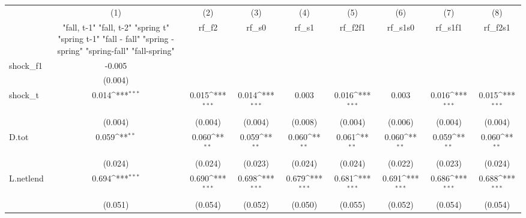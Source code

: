 {
\def\sym#1{\ifmmode^{#1}\else\(^{#1}\)\fi}
\begin{tabular}{l*{8}{c}}
\toprule
            &\multicolumn{1}{c}{(1)}&\multicolumn{1}{c}{(2)}&\multicolumn{1}{c}{(3)}&\multicolumn{1}{c}{(4)}&\multicolumn{1}{c}{(5)}&\multicolumn{1}{c}{(6)}&\multicolumn{1}{c}{(7)}&\multicolumn{1}{c}{(8)}\\
            &\multicolumn{1}{c}{  "fall, t-1" "fall, t-2" "spring t" "spring t-1"  "fall - fall" "spring - spring" "spring-fall" "fall-spring" }&\multicolumn{1}{c}{rf\_f2}&\multicolumn{1}{c}{rf\_s0}&\multicolumn{1}{c}{rf\_s1}&\multicolumn{1}{c}{rf\_f2f1}&\multicolumn{1}{c}{rf\_s1s0}&\multicolumn{1}{c}{rf\_s1f1}&\multicolumn{1}{c}{rf\_f2s1}\\
\midrule
shock\_f1    &      -0.005         &                     &                     &                     &                     &                     &                     &                     \\
            &     (0.004)         &                     &                     &                     &                     &                     &                     &                     \\
\addlinespace
shock\_t     &       0.014\sym{***}&       0.015\sym{***}&       0.014\sym{***}&       0.003         &       0.016\sym{***}&       0.003         &       0.016\sym{***}&       0.015\sym{***}\\
            &     (0.004)         &     (0.004)         &     (0.004)         &     (0.008)         &     (0.004)         &     (0.006)         &     (0.004)         &     (0.004)         \\
\addlinespace
D.tot       &       0.059\sym{**} &       0.060\sym{**} &       0.059\sym{**} &       0.060\sym{**} &       0.061\sym{**} &       0.060\sym{**} &       0.059\sym{**} &       0.060\sym{**} \\
            &     (0.024)         &     (0.024)         &     (0.023)         &     (0.024)         &     (0.024)         &     (0.022)         &     (0.023)         &     (0.024)         \\
\addlinespace
L.netlend   &       0.694\sym{***}&       0.690\sym{***}&       0.698\sym{***}&       0.679\sym{***}&       0.681\sym{***}&       0.691\sym{***}&       0.686\sym{***}&       0.688\sym{***}\\
            &     (0.051)         &     (0.054)         &     (0.052)         &     (0.050)         &     (0.055)         &     (0.052)         &     (0.054)         &     (0.054)         \\

\end{tabular}}
